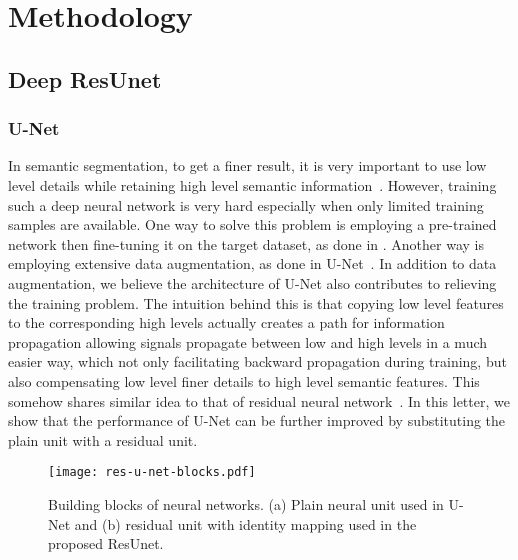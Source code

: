 \documentclass[journal]{IEEEtran}
\begin{document}
\section{Methodology}
\label{sec:methodology}

\subsection{Deep ResUnet}
\subsubsection{U-Net}
In semantic segmentation, to get a finer result, it is very important to use low level details while retaining high level semantic information~\cite{FCN2015fully,U-NET2015}. However, training such a deep neural network is very hard especially when only limited training samples are available. One way to solve this problem is employing a pre-trained network then fine-tuning it on the target dataset, as done in \cite{FCN2015fully}. Another way is employing extensive data augmentation, as done in U-Net~\cite{U-NET2015}. In addition to data augmentation, we believe the architecture of  U-Net also contributes to relieving the training problem. The intuition behind this is that copying low level features to the corresponding high levels actually creates a path for information propagation allowing signals propagate between low and high levels in a much easier way, which not only facilitating backward propagation during training, but also compensating low level finer details to high level semantic features. This somehow shares similar idea to that of residual neural network~\cite{resnet2015deep}. In this letter, we show that the performance of U-Net can be further improved by substituting the plain unit with a residual unit. 
\begin{figure}[t!]
	\begin{center}
		\texttt{[image: res-u-net-blocks.pdf]}
		\caption{Building blocks of neural networks. (a) Plain neural unit used in U-Net and (b) residual unit with identity mapping used in the proposed ResUnet.}
		\label{Fig:ResNet Block}
	\end{center}
	\vspace{-0.6cm}
\end{figure}
\end{document}
